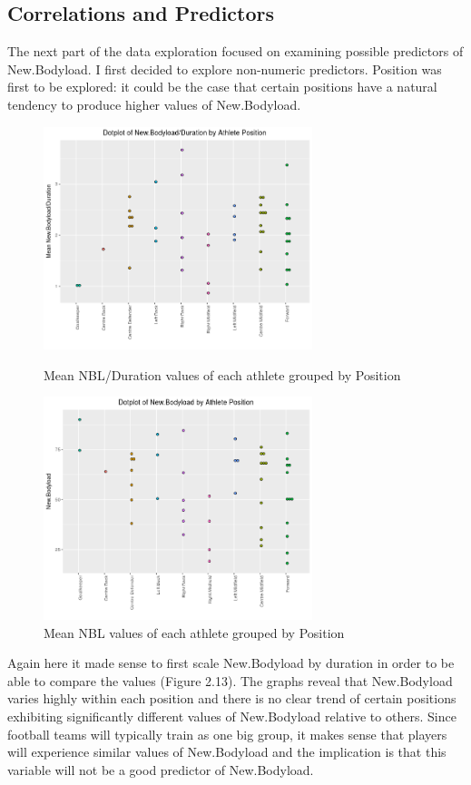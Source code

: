 \subsection{Correlations and Predictors}
The next part of the data exploration focused on examining possible predictors of New.Bodyload. I first decided to explore non-numeric predictors. Position was first to be explored: it could be the case that certain positions have a natural tendency to produce higher values of New.Bodyload.
\begin{figure}[h]
	\centering
	\begin{minipage}{.48\textwidth}
		\centering
		\includegraphics[width=1\linewidth, height=6.5cm]{Images/NBLPosDotPlot.png}
		\caption{Mean NBL/Duration values of each athlete grouped by Position}
	\end{minipage} %
	\begin{minipage}{.48\textwidth}
		\centering
		\includegraphics[width=1\linewidth, height=6.5cm]{Images/UnscaledDotplot.png}
		\caption{Mean NBL values of each athlete grouped by Position}
	\end{minipage} 
\end{figure}
Again here it made sense to first scale New.Bodyload by duration in order to be able to compare the values (Figure 2.13). The graphs reveal that New.Bodyload varies highly within each position and there is no clear trend of certain positions exhibiting significantly different values of New.Bodyload relative to others. Since football teams will typically train as one big group, it makes sense that players will experience similar values of New.Bodyload and the implication is that this variable will not be a good predictor of New.Bodyload.
